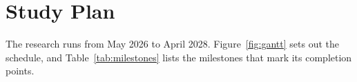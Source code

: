\section{Study Plan}
\label{sec:study-plan}

The research runs from May 2026 to April 2028. Figure~\ref{fig:gantt} sets out
the schedule, and Table~\ref{tab:milestones} lists the milestones that mark its
completion points.

\newcommand{\gkey}[1]{\tikz[baseline=-0.55ex]{\fill[#1,draw=black!55,line width=0.3pt]
  (0,-0.09) rectangle (0.40,0.13);}}
\newcommand{\gdia}{\tikz[baseline=-0.55ex]{\fill[gMile,draw=black!55,line width=0.3pt]
  (0.00,0.02) -- (0.11,0.15) -- (0.22,0.02) -- (0.11,-0.11) -- cycle;}}

